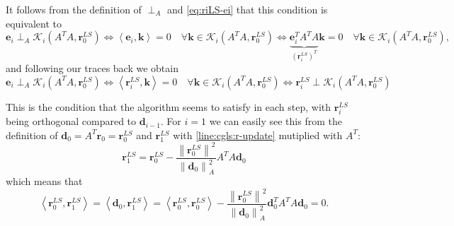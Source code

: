 \documentclass{article}
\begin{document}
	It follows from the definition of $\perp_{A}$ and \autoref{eq:riLS-ei} that this condition is equivalent to 
	\begin{equation}
		\textbf{e}_i \perp_{A} \mathcal{K}_i\left(A^T A, \textbf{r}_0^{LS} \right) \Leftrightarrow \left\langle \textbf{e}_i, \textbf{k} \right\rangle=0 \quad\forall\textbf{k}\in\mathcal{K}_i\left(A^T A, \textbf{r}_0^{LS} \right) \Leftrightarrow \underbrace{\textbf{e}_i^T A^T A}_{\left(\textbf{r}_i^{LS}\right)^T}  \textbf{k}=0 \quad\forall\textbf{k}\in\mathcal{K}_i\left(A^T A, \textbf{r}_0^{LS} \right),
	\end{equation}
	and following our traces back we obtain
	\begin{equation}
		\textbf{e}_i \perp_{A} \mathcal{K}_i\left(A^T A, \textbf{r}_0^{LS} \right) \Longleftrightarrow
		\left\langle\textbf{r}_i^{LS} , \textbf{k}\right\rangle=0 \quad\forall\textbf{k}\in\mathcal{K}_i\left(A^T A, \textbf{r}_0^{LS} \right) \Longleftrightarrow
		\textbf{r}_i^{LS} \perp \mathcal{K}_i\left(A^T A, \textbf{r}_0^{LS} \right)
	\end{equation}
	
	This is the condition that the algorithm seems to satisfy in each step, with $\textbf{r}_i^{LS}$ being orthogonal compared to $\textbf{d}_{i-1}$. For $i=1$ we can easily see this from the definition of $\textbf{d}_0 = A^T \textbf{r}_0 = \textbf{r}_0^{LS}$ and $\textbf{r}_1^{LS}$ with \autoref{line:cgls:r-update} mutiplied with $A^T$:
	\begin{equation}
		\textbf{r}_1^{LS} = \textbf{r}_0^{LS} - \frac{\left\| \textbf{r}_0^{LS} \right\|^2}{\left\| \textbf{d}_0 \right\|^2_A} A^T A \textbf{d}_0
	\end{equation}
	which means that
	\begin{equation}
		\left\langle \textbf{r}_0^{LS}, \textbf{r}_1^{LS}\right\rangle =  \left\langle \textbf{d}_0, \textbf{r}_1^{LS}\right\rangle = \left\langle \textbf{r}_0^{LS},\textbf{r}_0^{LS}\right\rangle - \frac{\left\| \textbf{r}_0^{LS} \right\|^2}{\left\| \textbf{d}_0 \right\|^2_A} \textbf{d}_0^T A^T A \textbf{d}_0 = 0.
	\end{equation}
	
\end{document}
